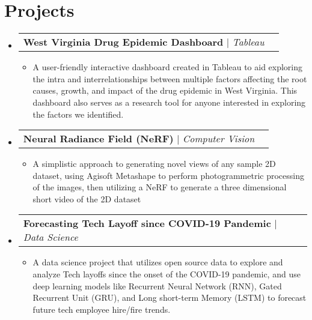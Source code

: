 \documentclass[letterpaper,11pt]{article}
\makeatletter
\newcommand{\resumeItem}[1]{
  \item\small{
    {#1 \vspace{-2pt}}
  }
}
\newcommand{\resumeProjectHeading}[2]{
    \vspace{-2pt}\item
    \begin{tabular*}{0.97\textwidth}{l@{\extracolsep{\fill}}r}
      \small#1 & #2 \\
    \end{tabular*}\vspace{-7pt}
}
\newcommand{\resumeSubHeadingListStart}{\begin{itemize}[leftmargin=0.15in, label={}]}
\newcommand{\resumeSubHeadingListEnd}{\end{itemize}}
\newcommand{\resumeItemListStart}{\begin{itemize}}
\newcommand{\resumeItemListEnd}{\end{itemize}\vspace{-5pt}}
\makeatother
\begin{document}
\section{Projects}
    \vspace{3pt}
    \resumeSubHeadingListStart
      
      \resumeProjectHeading
        {\textbf{West Virginia Drug Epidemic Dashboard} $|$ \emph{Tableau}}{}                            %
          \resumeItemListStart
            \resumeItem{A user-friendly interactive dashboard created in Tableau to aid exploring the intra and interrelationships between multiple factors affecting the root causes, growth, and impact of the drug epidemic in West Virginia. This dashboard also serves as a research tool for anyone interested in exploring the factors we identified.}
          \resumeItemListEnd
      
      \resumeProjectHeading
        {\textbf{Neural Radiance Field (NeRF)} $|$ \emph{Computer Vision}}{}                 %
          \resumeItemListStart
            \resumeItem{A simplistic approach to generating novel views of any sample 2D dataset, using Agisoft Metashape to perform photogrammetric processing of the images, then utilizing a NeRF to generate a three dimensional short video of the 2D dataset}
          \resumeItemListEnd
      
      \resumeProjectHeading
        {\textbf{Forecasting Tech Layoff since COVID-19 Pandemic} $|$ \emph{Data Science}}{}                                  %
          \resumeItemListStart
            \resumeItem{A data science project that utilizes open source data to explore and analyze Tech layoffs since the onset of the COVID-19 pandemic, and use deep learning models like Recurrent Neural Network (RNN), Gated Recurrent Unit (GRU), and Long short-term Memory (LSTM) to forecast future tech employee hire/fire trends.}
          \resumeItemListEnd
      
    \resumeSubHeadingListEnd






\end{document}
